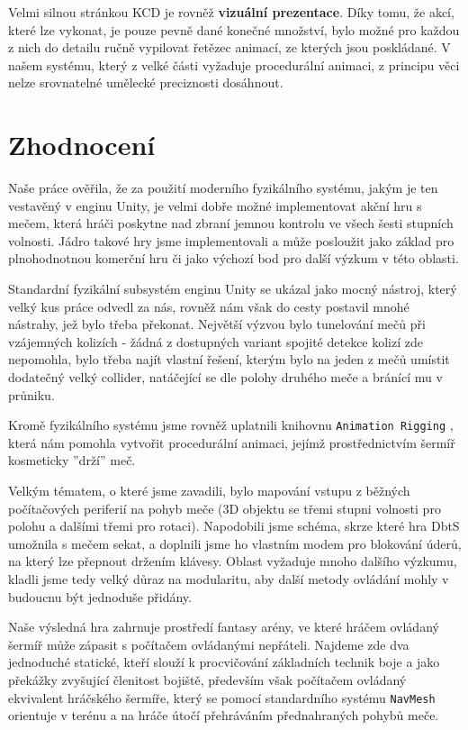 Velmi silnou stránkou \acl{KCD} je rovněž \textbf{vizuální prezentace}. Díky tomu, že akcí, které lze vykonat, je pouze pevně dané konečné množství, bylo možné pro každou z nich do detailu ručně vypilovat řetězec animací, ze kterých jsou poskládané. V našem systému, který z velké části vyžaduje procedurální animaci, z principu věci nelze srovnatelné umělecké preciznosti dosáhnout. 


\section{Zhodnocení}

Naše práce ověřila, že za použití moderního fyzikálního systému, jakým je ten vestavěný v enginu Unity, je velmi dobře možné implementovat akční hru s mečem, která hráči poskytne nad zbraní jemnou kontrolu ve všech šesti stupních volnosti. Jádro takové hry jsme implementovali a může posloužit jako základ pro plnohodnotnou komerční hru či jako výchozí bod pro další výzkum v této oblasti.

Standardní fyzikální subsystém enginu Unity se ukázal jako mocný nástroj, který velký kus práce odvedl za nás, rovněž nám však do cesty postavil mnohé nástrahy, jež bylo třeba překonat. Největší výzvou bylo tunelování mečů při vzájemných kolizích - žádná z dostupných variant spojité detekce kolizí zde nepomohla, bylo třeba najít vlastní řešení, kterým bylo na jeden z mečů umístit dodatečný velký collider, natáčející se dle polohy druhého meče a bránící mu v průniku. 

Kromě fyzikálního systému jsme rovněž uplatnili knihovnu \texttt{Animation Rigging} \cite{AnimationRigging}, která nám pomohla vytvořit procedurální animaci, jejímž prostřednictvím šermíř kosmeticky ''drží'' meč.

Velkým tématem, o které jsme zavadili, bylo mapování vstupu z běžných počítačových periferií na pohyb meče (3D objektu se třemi stupni volnosti pro polohu a dalšími třemi pro rotaci). Napodobili jsme schéma, skrze které hra \acl{DbtS} \cite{DieByTheSword} umožnila s mečem sekat, a doplnili jsme ho vlastním modem pro blokování úderů, na který lze přepnout držením klávesy. Oblast vyžaduje mnoho dalšího výzkumu, kladli jsme tedy velký důraz na modularitu, aby další metody ovládání mohly v budoucnu být jednoduše přidány.


Naše výsledná hra zahrnuje prostředí fantasy arény, ve které hráčem ovládaný šermíř může zápasit s počítačem ovládanými nepřáteli. Najdeme zde dva jednoduché statické, kteří slouží k procvičování základních technik boje a jako překážky zvyšující členitost bojiště, především však počítačem ovládaný ekvivalent hráčského šermíře, který se pomocí standardního systému \texttt{NavMesh} orientuje v terénu a na hráče útočí přehráváním přednahraných pohybů meče.

